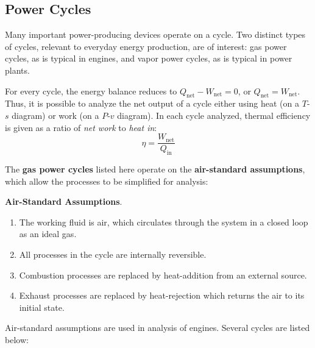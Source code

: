 \subsection{Power Cycles} %

Many important power-producing devices operate on a cycle. Two distinct types of cycles, relevant to everyday energy production, are of interest: gas power cycles, as is typical in engines, and vapor power cycles, as is typical in power plants.

For every cycle, the energy balance reduces to $Q_\text{net}-W_\text{net} = 0$, or $Q_\text{net} = W_\text{net}$. Thus, it is possible to analyze the net output of a cycle either using heat (on a $T$-$s$ diagram) or work (on a $P$-$v$ diagram). In each cycle analyzed, thermal efficiency is given as a ratio of \textit{net work} to \textit{heat in}: \[\eta = \frac{W_\text{net}}{Q_\text{in}}\]

The \textbf{gas power cycles} listed here operate on the \textbf{air-standard assumptions}, which allow the processes to be simplified for analysis:

\begin{shaded}
\textbf{Air-Standard Assumptions}.
\begin{enumerate}
    \item The working fluid is air, which circulates through the system in a closed loop as an ideal gas.
    \item All processes in the cycle are internally reversible.
    \item Combustion processes are replaced by heat-addition from an external source.
    \item Exhaust processes are replaced by heat-rejection which returns the air to its initial state.
\end{enumerate}
\end{shaded}

\newpage

Air-standard assumptions are used in analysis of engines. Several cycles are listed below:

